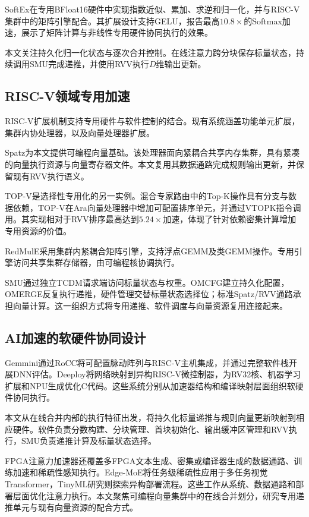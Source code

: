 \documentclass[journal]{IEEEtran}
\begin{document}
SoftEx在专用BFloat16硬件中实现指数近似、累加、求逆和归一化，并与RISC-V集群中的矩阵引擎配合\cite{ref7}。其扩展设计支持GELU，报告最高$10.8\times$的Softmax加速，展示了矩阵计算与非线性专用硬件协同执行的效果。

本文关注持久化归一化状态与逐次合并控制。在线注意力跨分块保存标量状态，持续调用SMU完成递推，并使用RVV执行$D$维输出更新。

\subsection{RISC-V领域专用加速}
RISC-V扩展机制支持专用硬件与软件控制的结合。现有系统涵盖功能单元扩展\cite{ref10,ref8}，集群内协处理器\cite{ref15,ref7}，以及向量处理器扩展\cite{ref11,ref13,ref12}。

Spatz为本文提供可编程向量基础。该处理器面向紧耦合共享内存集群，具有紧凑的向量执行资源与向量寄存器文件\cite{ref12}。本文复用其数据通路完成规则输出更新，并保留现有RVV执行语义。

TOP-V是选择性专用化的另一实例\cite{ref13}。混合专家路由中的Top-K操作具有分支与数据依赖，TOP-V在Ara向量处理器中增加可配置排序单元，并通过VTOPK指令调用。其实现相对于RVV排序最高达到$5.24\times$加速，体现了针对依赖密集计算增加专用资源的价值。

RedMulE采用集群内紧耦合矩阵引擎，支持浮点GEMM及类GEMM操作\cite{ref15}。专用引擎访问共享集群存储器，由可编程核协调执行。

SMU通过独立TCDM请求端访问标量状态与权重。OMCFG建立持久化配置，OMERGE反复执行递推，硬件管理交替标量状态选择位；标准Spatz/RVV通路承担向量计算。这一组织方式将专用递推、软件调度与向量资源复用连接起来。

\subsection{AI加速的软硬件协同设计}
Gemmini通过RoCC将可配置脉动阵列与RISC-V主机集成，并通过完整软件栈开展DNN评估\cite{ref16}。Deeploy将网络映射到异构RISC-V微控制器，为RV32核、机器学习扩展和NPU生成优化C代码\cite{ref17}。这些系统分别从加速器结构和编译映射层面组织软硬件协同执行。

本文从在线合并内部的执行特征出发，将持久化标量递推与规则向量更新映射到相应硬件。软件负责分数构建、分块管理、首块初始化、输出缓冲区管理和RVV执行，SMU负责递推计算及标量状态选择。

FPGA注意力加速器还覆盖多FPGA文本生成、密集或编译器生成的数据通路、训练加速和稀疏性感知执行\cite{ref20,ref21,ref22,ref23,ref24}。Edge-MoE将任务级稀疏性应用于多任务视觉Transformer\cite{ref25}，TinyML研究则探索异构部署流程\cite{ref26}。这些工作从系统、数据通路和部署层面优化注意力执行。本文聚焦可编程向量集群中的在线合并划分，研究专用递推单元与现有向量资源的配合方式。
\end{document}
